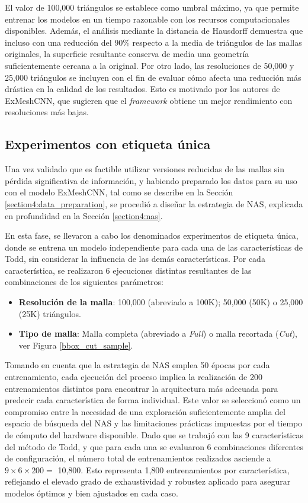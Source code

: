 El valor de 100,000 triángulos se establece como umbral máximo, ya que permite entrenar los modelos en un tiempo razonable con los recursos computacionales disponibles. Además, el análisis mediante la distancia de Hausdorff demuestra que incluso con una reducción del 90\% respecto a la media de triángulos de las mallas originales, la superficie resultante conserva de media una geometría suficientemente cercana a la original. Por otro lado, las resoluciones de 50,000 y 25,000 triángulos se incluyen con el fin de evaluar cómo afecta una reducción más drástica en la calidad de los resultados. Esto es motivado por los autores de ExMeshCNN, que sugieren que el \textit{framework} obtiene un mejor rendimiento con resoluciones más bajas.

\subsection{Experimentos con etiqueta única}
\label{unique_tag_exps}
Una vez validado que es factible utilizar versiones reducidas de las mallas sin pérdida significativa de información, y habiendo preparado los datos para su uso con el modelo ExMeshCNN, tal como se describe en la Sección \ref{section4:data_preparation}, se procedió a diseñar la estrategia de NAS, explicada en profundidad en la Sección \ref{section4:nas}.

En esta fase, se llevaron a cabo los denominados experimentos de etiqueta única, donde se entrena un modelo independiente para cada una de las características de Todd, sin considerar la influencia de las demás características. Por cada característica, se realizaron 6 ejecuciones distintas resultantes de las combinaciones de los siguientes parámetros:

\begin{itemize}
\item \textbf{Resolución de la malla}: 100,000 (abreviado a 100K); 50,000 (50K) o 25,000 (25K) triángulos.
\item \textbf{Tipo de malla}: Malla completa (abreviado a \textit{Full}) o malla recortada (\textit{Cut}), ver Figura \ref{bbox_cut_sample}.
\end{itemize}

Tomando en cuenta que la estrategia de NAS emplea 50 épocas por cada entrenamiento, cada ejecución del proceso implica la realización de 200 entrenamientos distintos para encontrar la arquitectura más adecuada para predecir cada característica de forma individual. Este valor se seleccionó como un compromiso entre la necesidad de una exploración suficientemente amplia del espacio de búsqueda del NAS y las limitaciones prácticas impuestas por el tiempo de cómputo del hardware disponible. Dado que se trabajó con las 9 características del método de Todd, y que para cada una se evaluaron 6 combinaciones diferentes de configuración, el número total de entrenamientos realizados asciende a $9 \times 6 \times 200 =$ 10,800. Esto representa 1,800 entrenamientos por característica, reflejando el elevado grado de exhaustividad y robustez aplicado para asegurar modelos óptimos y bien ajustados en cada caso.


